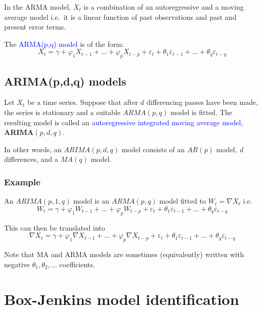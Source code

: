 \documentclass[12pt,a4paper,openany,twoside]{report}
\newcommand{\blue}{\textcolor{blue}}
\newcommand{\emphx}[1]{\blue{#1}}
\theoremstyle{definition}
\theoremstyle{remark}
\theoremstyle{plain}
\theoremstyle{definition}
\theoremstyle{definition}
\theoremstyle{definition}
\theoremstyle{remark}
\begin{document}
In the ARMA model, \(X_{t}\) is a combination of an autoregressive and a
moving average model i.e.~it is a linear function of past observations
and past and present error terms.

The \emphx{ARMA(p,q) model} is of the form:
\[X_{t} = \gamma + \varphi_{1}X_{t - 1} + \ldots + \varphi_{p}X_{t - p} + \varepsilon_{t} + \theta_{1}\varepsilon_{t - 1} + \ldots + \theta_{q}\varepsilon_{t - q}\]

\hypertarget{arimamodels}{%
\subsection{ARIMA(p,d,q) models}\label{arimamodels}}

Let \(X_{t}\) be a time series. Suppose that after \(d\) differencing passes
have been made, the series is stationary and a suitable \(ARMA(p,q)\)
model is fitted. The resulting model is called an \emphx{autoregressive
integrated moving average model}, \textbf{ARIMA}\(\left( p,d,q \right).\)

In other words, an \(ARIMA\left( p,d,q \right)\) model consists
of an \(AR(p)\) model, \textit{d} differences, and a \(MA(q)\) model.

\hypertarget{example}{%
\subsubsection*{Example}\label{example}}

An \(ARIMA(p,1,q )\) model is an
\(ARMA(p,q)\) model fitted to
\(W_{t} = \nabla X_{t}\text{\ i.e.}\)
\[W_{t} = \gamma + \varphi_{1}W_{t - 1} + \ldots + \varphi_{p}W_{t - p} + \varepsilon_{t} + \theta_{1}\varepsilon_{t - 1} + \ldots + \theta_{q}\varepsilon_{t - q}\]

This can then be translated into
\[\nabla X_{t} = \gamma + \varphi_{1} \nabla X_{t - 1}  + \ldots + \varphi_{p} \nabla X_{t - p} + \varepsilon_{t} + \theta_{1} \varepsilon_{t - 1} + \ldots + \theta_{q} \varepsilon_{t - q} \]

Note that MA and ARMA models are sometimes (equivalently) written with
negative \(\theta_{1},\theta_{2}, \ldots\) coefficients.

\hypertarget{bjidentification}{%
\section{Box-Jenkins model identification}\label{bjidentification}}
\end{document}
